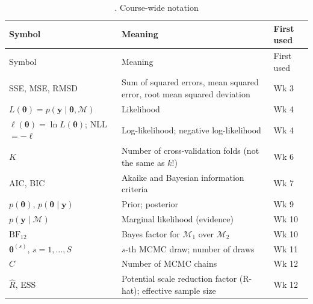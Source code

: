 \begin{longtable}[]{@{}
  >{\raggedright\arraybackslash}p{}
  >{\raggedright\arraybackslash}p{}
  >{\raggedright\arraybackslash}p{}@{}}
\caption{. Course-wide notation}\tabularnewline
\toprule\noalign{}
\begin{minipage}[b]{\linewidth}\raggedright
Symbol
\end{minipage} & \begin{minipage}[b]{\linewidth}\raggedright
Meaning
\end{minipage} & \begin{minipage}[b]{\linewidth}\raggedright
First used
\end{minipage} \\
\midrule\noalign{}
\endfirsthead
\toprule\noalign{}
\begin{minipage}[b]{\linewidth}\raggedright
Symbol
\end{minipage} & \begin{minipage}[b]{\linewidth}\raggedright
Meaning
\end{minipage} & \begin{minipage}[b]{\linewidth}\raggedright
First used
\end{minipage} \\
\midrule\noalign{}
\endhead
\bottomrule\noalign{}
\endlastfoot
SSE, MSE, RMSD & Sum of squared errors, mean squared error, root mean
squared deviation & Wk 3 \\
\(L(\boldsymbol\theta) = p(\mathbf{y}\mid\boldsymbol\theta,\mathcal{M})\)
& Likelihood & Wk 4 \\
\(\ell(\boldsymbol\theta) = \ln L(\boldsymbol\theta)\); NLL \(= -\ell\)
& Log-likelihood; negative log-likelihood & Wk 4 \\
\(K\) & Number of cross-validation folds (not the same as \(k\)!) & Wk
6 \\
AIC, BIC & Akaike and Bayesian information criteria & Wk 7 \\
\(p(\boldsymbol\theta)\), \(p(\boldsymbol\theta\mid\mathbf{y})\) &
Prior; posterior & Wk 9 \\
\(p(\mathbf{y}\mid\mathcal{M})\) & Marginal likelihood (evidence) & Wk
10 \\
\(\mathrm{BF}_{12}\) & Bayes factor for \(\mathcal{M}_1\) over
\(\mathcal{M}_2\) & Wk 10 \\
\(\boldsymbol\theta^{(s)}\), \(s = 1,\dots,S\) & \(s\)-th MCMC draw;
number of draws & Wk 11 \\
\(C\) & Number of MCMC chains & Wk 12 \\
\(\hat R\), ESS & Potential scale reduction factor (R-hat); effective
sample size & Wk 12 \\
\end{longtable}

